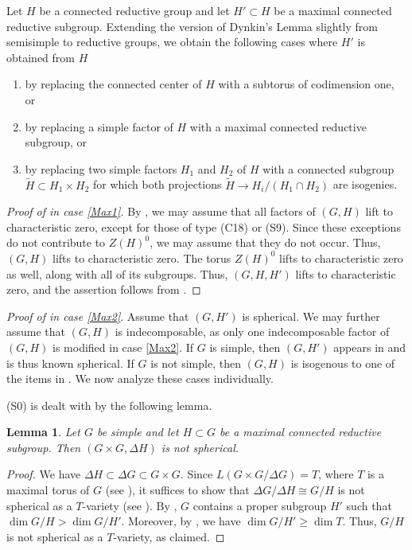 \documentclass[12pt]{amsart}
\renewcommand{\tilde}{\widetilde}
\numberwithin{equation}{section}
\newtheorem{lemma}[lemma]{Lemma}
\theoremstyle{definition}
\begin{document}
Let $H$ be a connected reductive group and let $H'\subset H$ be a
maximal connected reductive subgroup. Extending the version of Dynkin's Lemma
\cite[Lem.~3.3]{Knop5} slightly from semisimple to
reductive groups, we obtain the following cases where $H'$ is obtained from
$H$
\begin{enumerate}
\item\label{Max1} by replacing the connected center of $H$ with a subtorus of
  codimension one, or
\item \label{Max2} by replacing a simple factor of $H$ with a maximal
  connected reductive subgroup, or
\item \label{Max3} by replacing two simple factors $H_1$ and $H_2$ of $H$ with a
  connected subgroup $\tilde H\subset H_1\times H_2$ for which both
  projections $\tilde H\to H_i/(H_1\cap H_2)$ are isogenies.
\end{enumerate}

\begin{proof}[Proof of  in case \ref{Max1}]
  By , we may assume that all factors of $(G,H)$ lift to
  characteristic zero, except for those of type (C18) or (S9). Since
  these exceptions do not contribute to $Z(H)^0$, we may assume that they do not
  occur.  Thus, $(G,H)$ lifts to characteristic zero. The torus
  $Z(H)^0$ lifts to characteristic zero as well, along with all of its
  subgroups. Thus, $(G,H,H')$ lifts to characteristic zero, and the
  assertion follows from .
\end{proof}

\emph{Proof of  in case \ref{Max2}}.  Assume that $(G,H')$ is
spherical.  We may further assume that $(G,H)$ is indecomposable, as
only one indecomposable factor of $(G,H)$ is modified in case \ref{Max2}.  If
$G$ is simple, then $(G,H')$ appears in \cite[Tables 1 and 2]{KR} and
is thus known spherical. If $G$ is not simple, then
$(G,H)$ is isogenous to one of the items in . We now
analyze these cases individually.

(S0) is dealt with by the following lemma.

\begin{lemma}
  \label{lem:3}
  Let $G$ be simple and let $H \subset G$ be a maximal connected
  reductive subgroup. Then $(G\times G,\Delta H)$ is not spherical.
\end{lemma}

\begin{proof}
  We have $\Delta H \subset \Delta G \subset G \times G$. Since
  $L(G \times G/\Delta G) = T$, where $T$ is a maximal torus of $G$
  (see ), it suffices to show that
  $\Delta G/\Delta H \cong G/H$ is not spherical as a $T$-variety  (see
  ). By , $G$
  contains a proper subgroup $H'$ such that $\dim G/H > \dim
  G/H'$. Moreover, by , we have $\dim G/H' \geqslant \dim
  T$. Thus, $G/H$ is not spherical  as a $T$-variety, as claimed.
\end{proof}
\end{document}
